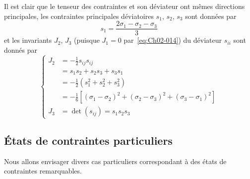 Il est clair que le tenseur des contraintes et son déviateur ont mêmes directions principales, les contraintes principales déviatoires $s_1$, $s_2$, $s_3$ sont données par 
\begin{equation}
    s_1 = \frac{2\sigma_1 - \sigma_2 - \sigma_3}{3}
    \label{eq:Ch02-015}
\end{equation}
et les invariants $J_2$, $J_3$ (puisque $J_1 = 0$ par~\eqref{eq:Ch02-014}) du déviateur $s_{ii}$ sont donnés par 
\begin{equation}
    \left\{
    \begin{aligned}
        J_2 &= -\frac{1}{2}s_{ij}s_{ij}\\
        &= s_1 s_2 + s_2 s_3 + s_3 s_1\\
        &= -\frac{1}{2} \left( s_1^2 + s_2^2 + s_3^2 \right)\\
        &= -\frac{1}{6} \left[ \left( \sigma_1 - \sigma_2 \right)^2 + \left( \sigma_2 - \sigma_3 \right)^2 + \left( \sigma_3 -\sigma_1 \right)^2 \right]\\
        J_3 &= \det \left( s_{ij} \right)  = s_1 s_2 s_3
    \end{aligned}
    \right.
    \label{eq:Ch02-016}
\end{equation}
\subsection{États de contraintes particuliers} \label{ssec:Ch02-1.3}
Nous allons envisager divers cas particuliers correspondant à des états de contraintes remarquables. 
